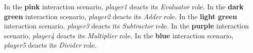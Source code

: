 In the \textbf{pink} interaction scenario, \textit{player1} deacts its \textit{Evaluator} role.
In the \textbf{dark green} interaction scenario, \textit{player2} deacts its \textit{Adder} role.
In the \textbf{light green} interaction scenario, \textit{player3} deacts its \textit{Subtractor} role.
In the \textbf{purple} interaction scenario, \textit{player4} deacts its \textit{Multiplier} role.
In the \textbf{blue} interaction scenario, \textit{player5} deacts its \textit{Divider} role.